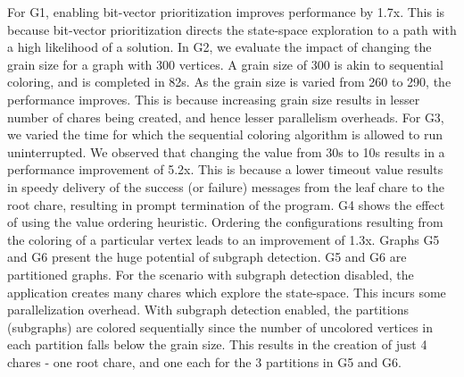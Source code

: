 \documentclass[10pt,oneside]{article}
\begin{document}
For G1, enabling bit-vector prioritization improves performance by 1.7x. This is because bit-vector prioritization
directs the state-space exploration to a path with a high likelihood of a solution. In G2, we evaluate the impact of changing the grain size for a graph with 300 vertices. A grain size of 300 is akin to 
sequential coloring, and is completed in 82s. As the grain size is varied from 260 to 290, the performance improves. This is because increasing grain size results in lesser number of chares being created, and hence lesser parallelism overheads. For G3, we varied the time for which the sequential coloring algorithm is allowed to run uninterrupted. We observed that changing the value from 30s to 10s results in a performance improvement of 5.2x. This is because a lower timeout value results in speedy delivery of the success (or failure) messages from the leaf chare to the root chare, resulting in prompt termination of the program. G4 shows the effect of using the value ordering heuristic. Ordering the configurations resulting from the coloring of a particular vertex leads to an improvement of 1.3x. Graphs
G5 and G6 present the huge potential of subgraph detection. G5 and G6 are partitioned graphs. For the scenario with subgraph detection disabled, the application creates many chares which explore the state-space. This incurs some parallelization overhead. With subgraph detection enabled, the partitions (subgraphs) are colored sequentially since the number of uncolored vertices in each partition falls below the grain size. This results in the creation of just 4 chares - one root chare, and one each for the 3 partitions in G5 and G6.  
\end{document}
